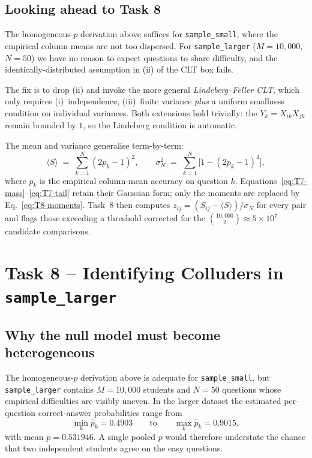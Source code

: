 \documentclass[11pt,a4paper]{article}
\begin{document}
\subsection{Looking ahead to Task 8}
The homogeneous-$p$ derivation above suffices for
\texttt{sample\_small}, where the empirical column means are not too
dispersed. For \texttt{sample\_larger} ($M=10{,}000$, $N=50$) we have
no reason to expect questions to share difficulty, and the
identically-distributed assumption in (ii) of the CLT box fails.

The fix is to drop (ii) and invoke the more general
\emph{Lindeberg--Feller CLT}, which only requires (i)~independence,
(iii)~finite variance \emph{plus} a uniform smallness condition on
individual variances. Both extensions hold trivially: the
$Y_k = X_{ik}X_{jk}$ remain bounded by $1$, so the Lindeberg
condition is automatic.

The mean and variance generalise term-by-term:
\begin{equation}
  \langle S\rangle \;=\; \sum_{k=1}^{N}(2p_k-1)^2,
  \qquad
  \sigma_N^2 \;=\; \sum_{k=1}^{N}\bigl[1-(2p_k-1)^4\bigr],
  \label{eq:T8-moments}
\end{equation}
where $p_k$ is the empirical column-mean accuracy on question $k$.
Equations~\eqref{eq:T7-mass}--\eqref{eq:T7-tail} retain their
Gaussian form; only the moments are replaced by
Eq.~\eqref{eq:T8-moments}. Task~8 then computes
$z_{ij} = (S_{ij} - \langle S\rangle)/\sigma_N$ for every pair and
flags those exceeding a threshold corrected for the
$\binom{10{,}000}{2} \approx 5\times 10^7$ candidate comparisons.

\vspace{1em}

\section{Task 8 -- Identifying Colluders in \texttt{sample\_larger}}

\subsection{Why the null model must become heterogeneous}
The homogeneous-$p$ derivation above is adequate for
\texttt{sample\_small}, but \texttt{sample\_larger} contains
$M=10{,}000$ students and $N=50$ questions whose empirical difficulties
are visibly uneven. In the larger dataset the estimated per-question
correct-answer probabilities range from
\[
  \min_k \hat p_k = 0.4903
  \qquad\text{to}\qquad
  \max_k \hat p_k = 0.9015,
\]
with mean $\bar p = 0.531946$. A single pooled $p$ would therefore
understate the chance that two independent students agree on the easy
questions.
\end{document}
